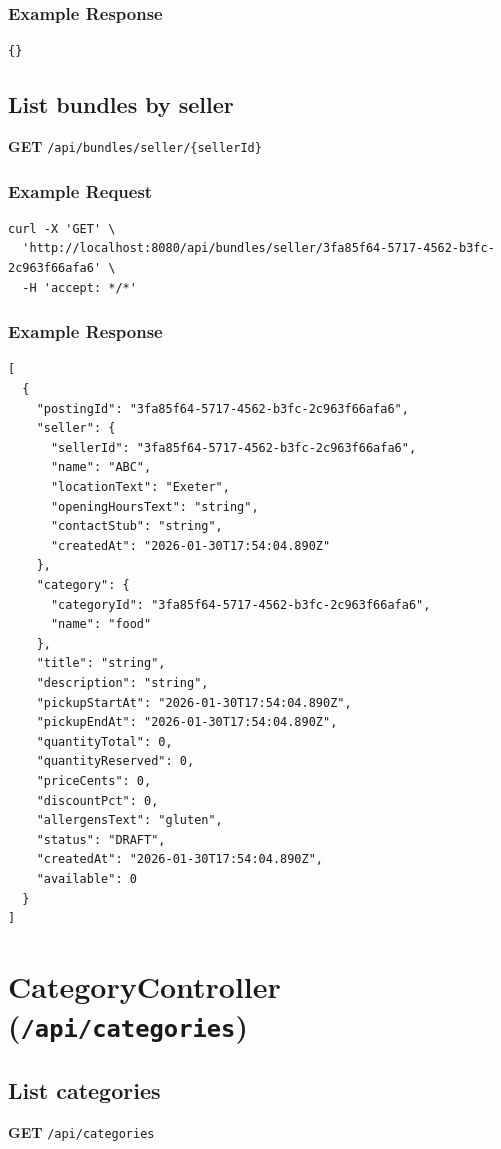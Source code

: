 \documentclass[a4paper,11pt]{article}
\begin{document}
\subsubsection*{Example Response}
\begin{lstlisting}
{}
\end{lstlisting}

\subsection{List bundles by seller}
\textbf{GET} \texttt{/api/bundles/seller/\{sellerId\}}
\subsubsection*{Example Request}
\begin{lstlisting}
curl -X 'GET' \
  'http://localhost:8080/api/bundles/seller/3fa85f64-5717-4562-b3fc-2c963f66afa6' \
  -H 'accept: */*'
\end{lstlisting}

\subsubsection*{Example Response}
\begin{lstlisting}
[
  {
    "postingId": "3fa85f64-5717-4562-b3fc-2c963f66afa6",
    "seller": {
      "sellerId": "3fa85f64-5717-4562-b3fc-2c963f66afa6",
      "name": "ABC",
      "locationText": "Exeter",
      "openingHoursText": "string",
      "contactStub": "string",
      "createdAt": "2026-01-30T17:54:04.890Z"
    },
    "category": {
      "categoryId": "3fa85f64-5717-4562-b3fc-2c963f66afa6",
      "name": "food"
    },
    "title": "string",
    "description": "string",
    "pickupStartAt": "2026-01-30T17:54:04.890Z",
    "pickupEndAt": "2026-01-30T17:54:04.890Z",
    "quantityTotal": 0,
    "quantityReserved": 0,
    "priceCents": 0,
    "discountPct": 0,
    "allergensText": "gluten",
    "status": "DRAFT",
    "createdAt": "2026-01-30T17:54:04.890Z",
    "available": 0
  }
]
\end{lstlisting}

\section{CategoryController (\texttt{/api/categories})}

\subsection{List categories}
\textbf{GET} \texttt{/api/categories}
\end{document}
